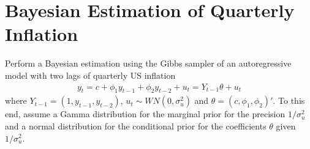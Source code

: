 \section[Bayesian Estimation of Quarterly Inflation]{Bayesian Estimation of Quarterly Inflation\label{ex:BayesianEstimationQuarterlyInflation}}
Perform a Bayesian estimation using the Gibbs sampler of an autoregressive model with two lags of quarterly US inflation
\begin{align*}
y_t = c + \phi_1 y_{t-1} + \phi_2 y_{t-2} + u_t = Y_{t-1} \theta + u_t
\end{align*}
where \(Y_{t-1}=(1,y_{t-1},y_{t-2})\), \(u_t\sim WN(0,\sigma_u^2)\)
and \(\theta = (c,\phi_1,\phi_2)'\).
To this end, assume a Gamma distribution for the marginal prior for the precision \(1/\sigma_u^2\)
  and a normal distribution for the conditional prior for the coefficients \(\theta \) given \(1/\sigma_u^2\).
